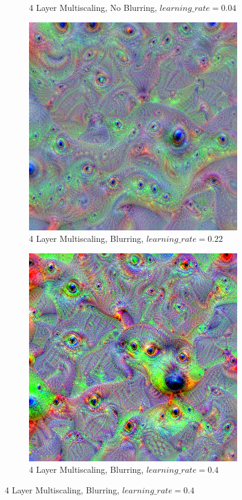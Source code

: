 \begin{figure}
\begin{subfigure}[t]{0.31\textwidth}
        \caption{4 Layer Multiscaling, No Blurring, \(learning\_rate = 0.04\)}
    \end{subfigure}
    \hfill
    \begin{subfigure}[t]{0.31\textwidth}
        \captionsetup{justification=centering}
        \centering
        \includegraphics[width=.7\linewidth]{figuras/feat_vis/experiments/layers/final/l12/random_image_pl4_lr2.2e-1_layer26.png}
        \caption{4 Layer Multiscaling, Blurring, \(learning\_rate = 0.22\)}
    \end{subfigure}
    \hfill
    \begin{subfigure}[t]{0.31\textwidth}
        \captionsetup{justification=centering}
        \centering
        \includegraphics[width=.7\linewidth]{figuras/feat_vis/experiments/layers/final/l12/random_image_pl4_lr4e-1_layer26.png}
        \caption{4 Layer Multiscaling, Blurring, \(learning\_rate = 0.4\)}

\end{subfigure}
\end{figure}
